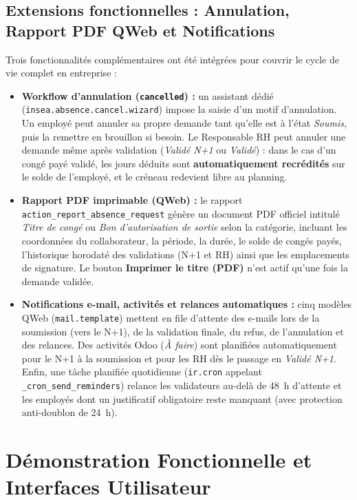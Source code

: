 \documentclass[11pt,a4paper]{article}
\begin{document}
\subsection{Extensions fonctionnelles : Annulation, Rapport PDF QWeb et Notifications}
Trois fonctionnalités complémentaires ont été intégrées pour couvrir le cycle de vie complet en entreprise :
\begin{itemize}[itemsep=2pt]
    \item \textbf{Workflow d'annulation (\texttt{cancelled}) :} un assistant dédié (\texttt{insea.absence.cancel.wizard}) impose la saisie d'un motif d'annulation. Un employé peut annuler sa propre demande tant qu'elle est à l'état \textit{Soumis}, puis la remettre en brouillon si besoin. Le Responsable RH peut annuler une demande même après validation (\textit{Validé N+1} ou \textit{Validé}) : dans le cas d'un congé payé validé, les jours déduits sont \textbf{automatiquement recrédités} sur le solde de l'employé, et le créneau redevient libre au planning.
    \item \textbf{Rapport PDF imprimable (QWeb) :} le rapport \texttt{action\_report\_absence\_request} génère un document PDF officiel intitulé \textit{Titre de congé} ou \textit{Bon d'autorisation de sortie} selon la catégorie, incluant les coordonnées du collaborateur, la période, la durée, le solde de congés payés, l'historique horodaté des validations (N+1 et RH) ainsi que les emplacements de signature. Le bouton \textbf{Imprimer le titre (PDF)} n'est actif qu'une fois la demande validée.
    \item \textbf{Notifications e-mail, activités et relances automatiques :} cinq modèles QWeb (\texttt{mail.template}) mettent en file d'attente des e-mails lors de la soumission (vers le N+1), de la validation finale, du refus, de l'annulation et des relances. Des activités Odoo (\textit{À faire}) sont planifiées automatiquement pour le N+1 à la soumission et pour les RH dès le passage en \textit{Validé N+1}. Enfin, une tâche planifiée quotidienne (\texttt{ir.cron} appelant \texttt{\_cron\_send\_reminders}) relance les validateurs au-delà de 48~h d'attente et les employés dont un justificatif obligatoire reste manquant (avec protection anti-doublon de 24~h).
\end{itemize}

\section{Démonstration Fonctionnelle et Interfaces Utilisateur}
\end{document}
